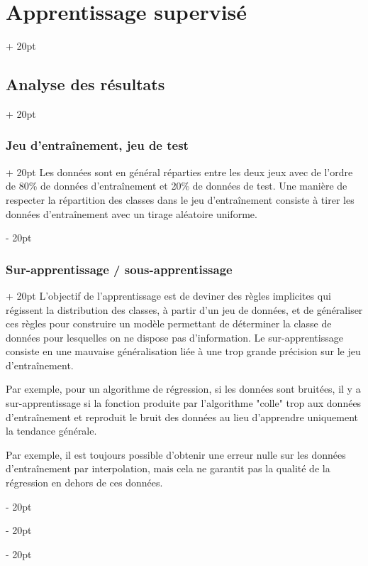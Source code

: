 \documentclass[a4paper, 12pt, twoside]{article}
\newcommand{\simplecit}[1]{\guillemotleft$\;$#1$\;$\guillemotright}
\newcommand{\cit}[1]{\simplecit{\textcolor{656565}{#1}}}
\newcommand{\quo}[1]{\cit{\it #1}}
\newcommand{\ind}[1][20pt]{\advance\leftskip + #1}
\newcommand{\deind}[1][20pt]{\advance\leftskip - #1}
\newenvironment{indt}[2][20pt]{#2 \par \ind[#1]}{\par \deind} %
\begin{document}
\begin{indt}{\section{Apprentissage supervisé}}
\begin{indt}{\subsection{Analyse des résultats}}
\begin{indt}{\subsubsection{Jeu d'entraînement, jeu de test}}
                Les données sont en général réparties entre les deux jeux avec de l'ordre de 80\% de données d'entraînement et 20\% de données de test. Une manière de respecter la répartition des classes dans le jeu d'entraînement consiste à tirer les données d'entraînement avec un tirage aléatoire uniforme.
            \end{indt}

            \vspace{12pt}
            
            \begin{indt}{\subsubsection{Sur-apprentissage / sous-apprentissage}}
                L'objectif de l'apprentissage est de deviner des règles implicites qui régissent la distribution des classes, à partir d'un jeu de données, et de généraliser ces règles pour construire un modèle permettant de déterminer la classe de données pour lesquelles on ne dispose pas d'information.
                Le sur-apprentissage consiste en une mauvaise généralisation liée à une trop grande précision sur le jeu d'entraînement.

                Par exemple, pour un algorithme de régression, si les données sont bruitées, il y a sur-apprentissage si la fonction produite par l'algorithme "colle" trop aux données d'entraînement et reproduit le bruit des données au lieu d'apprendre uniquement la tendance générale.

                Par exemple, il est toujours possible d'obtenir une erreur nulle sur les données d'entraînement par interpolation, mais cela ne garantit pas la qualité de la régression en dehors de ces données.


                \begin{center}
\end{center}
\end{indt}
\end{indt}
\end{indt}
\end{document}
